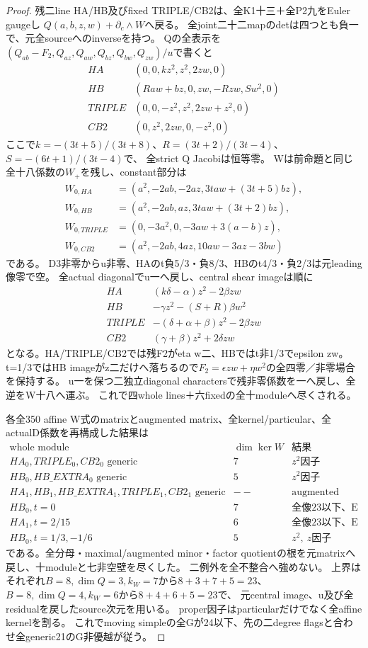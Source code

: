 \documentclass[a4paper,11pt]{ltjsarticle}
\theoremstyle{definition}
\begin{document}
\begin{proof}
残二line HA/HB及びfixed TRIPLE/CB2は、全K1十三＋全P2九をEuler gaugeし
$Q(a,b,z,w)+\partial_c\wedge W$へ戻る。
全joint二十二mapのdetは四つとも負一で、元全sourceへのinverseを持つ。
Qの全表示を$(Q_{ab}-F_2,Q_{az},Q_{aw},Q_{bz},Q_{bw},Q_{zw})/u$で書くと
\[
\begin{array}{c|c}
 HA&(0,0,kz^2,z^2,2zw,0)\\
 HB&(Raw+bz,0,zw,-Rzw,Sw^2,0)\\
 TRIPLE&(0,0,-z^2,z^2,2zw+z^2,0)\\
 CB2&(0,z^2,2zw,0,-z^2,0)
\end{array}
\]
ここで$k=-(3t+5)/(3t+8)$、$R=(3t+2)/(3t-4)$、$S=-(6t+1)/(3t-4)$で、
全strict Q Jacobiは恒等零。
Wは前命題と同じ全十八係数の$W_+$を残し、constant部分は
\[
\begin{aligned}
 W_{0,HA}&=(a^2,-2ab,-2az,3taw+(3t+5)bz),\\
 W_{0,HB}&=(a^2,-2ab,az,3taw+(3t+2)bz),\\
 W_{0,TRIPLE}&=(0,-3a^2,0,-3aw+3(a-b)z),\\
 W_{0,CB2}&=(a^2,-2ab,4az,10aw-3az-3bw)
\end{aligned}
\]
である。
D3非零からu非零、HAのt負5/3・負8/3、HBのt4/3・負2/3は元leading像零で空。
全actual diagonalでu一へ戻し、central shear imageは順に
\[
\begin{array}{c|c}
 HA&(k\delta-\alpha)z^2-2\beta zw\\
 HB&-\gamma z^2-(S+R)\beta w^2\\
 TRIPLE&-(\delta+\alpha+\beta)z^2-2\beta zw\\
 CB2&(\gamma+\beta)z^2+2\delta zw
\end{array}
\]
となる。HA/TRIPLE/CB2では残F2がeta w二、HBではt非1/3でepsilon zw。
t=1/3ではHB imageがz二だけへ落ちるので$F_2=\epsilon zw+\eta w^2$の全四零／非零場合を保持する。
u一を保つ二独立diagonal charactersで残非零係数を一へ戻し、全逆をW十八へ運ぶ。
これで四whole lines＋六fixedの全十moduleへ尽くされる。

各全350 affine W式のmatrixとaugmented matrix、全kernel/particular、全actualD係数を再構成した結果は
\[
\begin{array}{c|c|c}
 \text{whole module}&\dim\ker W&\text{結果}\\\hline
 HA_0,TRIPLE_0,CB2_0\text{ generic}&7&z^2\text{因子}\\
 HB_0,HB\_EXTRA_0\text{ generic}&5&z^2\text{因子}\\
 HA_1,HB_1,HB\_EXTRA_1,TRIPLE_1,CB2_1\text{ generic}&--&\text{augmented rank増加}\\
 HB_0,t=0&7&\text{全像23以下、E未処理}\\
 HA_1,t=2/15&6&\text{全像23以下、E未処理}\\
 HB_0,t=1/3,-1/6&5&z^2,\ z\text{因子}
\end{array}
\]
である。全分母・maximal/augmented minor・factor quotientの根を元matrixへ戻し、十moduleと七非空壁を尽くした。
二例外を全不整合へ強めない。
上界はそれぞれ$B=8,\dim Q=3,k_W=7$から$8+3+7+5=23$、
$B=8,\dim Q=4,k_W=6$から$8+4+6+5=23$で、
元central image、u及び全residualを戻したsource次元を用いる。
proper因子はparticularだけでなく全affine kernelを割る。
これでmoving simpleの全Gが24以下、先の二degree flagsと合わせ全generic21のG非優越が従う。
\end{proof}
\end{document}
